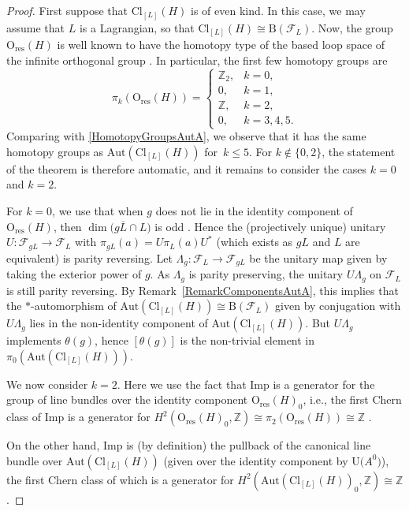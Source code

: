 \documentclass[11pt]{article}
\numberwithin{equation}{section}
\numberwithin{equation}{section}
\newcommand{\Z}{\mathbb{Z}}
\newcommand{\B}{\mathrm{B}}
\newcommand{\Cl}{\mathrm{Cl}}
\newcommand{\res}{\mathrm{res}}
\newcommand{\Aut}{\mathrm{Aut}}
\newcommand{\Imp}{\mathrm{Imp}}
\newcommand{\U}{\mathrm{U}}
\renewcommand{\O}{\mathrm{O}}
\begin{document}
\begin{proof}
First suppose that $\Cl_{[L]}(H)$ is of even kind.
In this case, we may assume that $L$ is a Lagrangian, so that $\Cl_{[L]}(H) \cong \B(\mathcal{F}_L)$.
Now, the group $\O_{\res}(H)$ is well known to have the homotopy type of the based loop space of the infinite orthogonal group \cite[Proposition~12.4.2]{PressleySegal}.
In particular, the first few homotopy groups are
\begin{equation} \label{FirstHomotopyGroupsOres}
 \pi_k(\O_{\res}(H)) = \begin{cases} \Z_2, & k=0, \\ 0, & k=1, \\ \Z, & k=2, \\ 0, & k=3, 4, 5. \end{cases}
\end{equation}
Comparing with \eqref{HomotopyGroupsAutA}, we observe that it has the same homotopy groups as $\Aut(\Cl_{[L]}(H))$ for~$k \leq 5$.
For $k\notin\{0, 2\}$, the statement of the theorem is therefore automatic, and it remains to consider the cases $k=0$ and $k=2$.

For $k=0$, we use that when $g$ does not lie in the identity component of $\O_{\res}(H)$, then $\dim\big(g \overline{L} \cap L\big)$ is odd \cite[Theorem~3.5.1]{PlymenRobinson}.
Hence the (projectively unique) unitary $U\colon \mathcal{F}_{gL} \to \mathcal{F}_L$ with $\pi_{gL}(a) = U \pi_L(a) U^*$ (which exists as $gL$ and $L$ are equivalent) is parity reversing.
Let $\Lambda_g\colon \mathcal{F}_L \to \mathcal{F}_{gL}$ be the unitary map given by taking the exterior power of $g$.
As $\Lambda_g$ is parity preserving, the unitary $U \Lambda_g$ on $\mathcal{F}_L$ is still parity reversing.
By Remark~\ref{RemarkComponentsAutA}, this implies that the $*$-automorphism of $\Aut(\Cl_{[L]}(H)) \cong \B(\mathcal{F}_L)$ given by conjugation with $U \Lambda_g$ lies in the non-identity component of $\Aut(\Cl_{[L]}(H))$. But $U \Lambda_g$ implements $\theta(g)$, hence $[\theta(g)]$ is the non-trivial element in $\pi_0(\Aut(\Cl_{[L]}(H)))$.

We now consider $k=2$.
Here we use the fact that $\Imp$ is a generator for the group of line bundles over the identity component $\O_{\res}(H)_0$, i.e., the first Chern class of $\Imp$ is a generator for $H^2(\O_{\res}(H)_0, \Z) \cong \pi_2(\O_{\res}(H)) \cong \Z$ \cite[Proposition~1.2]{SperaWurzbacherSpinors}.


On the other hand, $\Imp$ is (by definition) the pullback of the canonical line bundle over $\Aut(\Cl_{[L]}(H))$ \big(given over the identity component by $\U\big(A^0\big)$\big), the first Chern class of which is a generator for $H^2(\Aut(\Cl_{[L]}(H))_0, \Z) \cong \Z$.


\end{proof}
\end{document}
